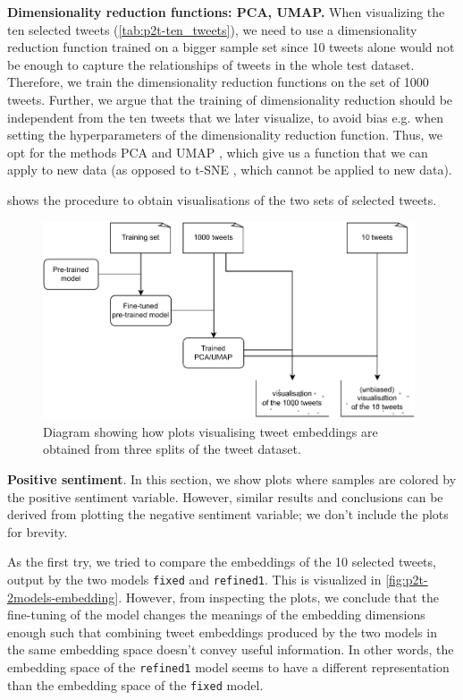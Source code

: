 \textbf{Dimensionality reduction functions: PCA, UMAP.} When visualizing the ten selected tweets (\cref{tab:p2t-ten_tweets}), we need to use a dimensionality reduction function trained on a bigger sample set since 10 tweets alone would not be enough to capture the relationships of tweets in the whole test dataset. Therefore, we train the dimensionality reduction functions on the set of 1000 tweets. Further, we argue that the training of dimensionality reduction should be independent from the ten tweets that we later visualize, to avoid bias e.g. when setting the hyperparameters of the dimensionality reduction function. Thus, we opt for the methods PCA and UMAP \cite{umap}, which give us a function that we can apply to new data (as opposed to t-SNE \cite{tsne}, which cannot be applied to new data).

 shows the procedure to obtain visualisations of the two sets of selected tweets.

\begin{figure}
    \centering
    \includegraphics[width=11cm]{images/transformers_embeddings_diagram.pdf}
    \caption{Diagram showing how plots visualising tweet embeddings are obtained from three splits of the tweet dataset.}
    \label{fig:transformers_embeddings_diagram}
\end{figure}

\textbf{Positive sentiment}. In this section, we show plots where samples are colored by the positive sentiment variable. However, similar results and conclusions can be derived from plotting the negative sentiment variable; we don't include the plots for brevity.

As the first try, we tried to compare the embeddings of the 10 selected tweets, output by the two models \texttt{fixed} and \texttt{refined1}. This is visualized in \cref{fig:p2t-2models-embedding}. However, from inspecting the plots, we conclude that the fine-tuning of the model changes the meanings of the embedding dimensions enough such that combining tweet embeddings produced by the two models in the same embedding space doesn't convey useful information. In other words, the embedding space of the \texttt{refined1} model seems to have a different representation than the embedding space of the \texttt{fixed} model.

